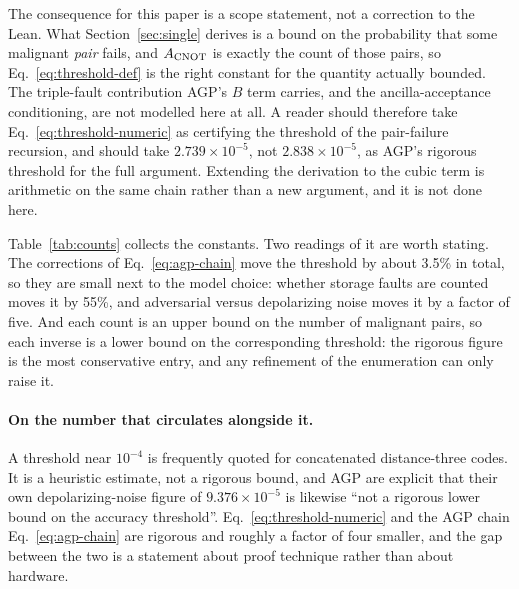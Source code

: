 \documentclass[aps,prx,reprint,nofootinbib,superscriptaddress]{revtex4-2}
\begin{document}
The consequence for this paper is a scope statement, not a correction to the
Lean. What Section~\ref{sec:single} derives is a bound on the probability that
some malignant \emph{pair} fails, and $A_{\rm CNOT}$ is exactly the count of
those pairs, so Eq.~\eqref{eq:threshold-def} is the right constant for the
quantity actually bounded. The triple-fault contribution AGP's $B$ term carries,
and the ancilla-acceptance conditioning, are not modelled here at all. A reader
should therefore take Eq.~\eqref{eq:threshold-numeric} as certifying the
threshold of the pair-failure recursion, and should take $2.739 \times 10^{-5}$,
not $2.838 \times 10^{-5}$, as AGP's rigorous threshold for the full argument.
Extending the derivation to the cubic term is arithmetic on the same chain
rather than a new argument, and it is not done here.

\begin{table}[htbp]
\caption{Malignant-pair counts AGP report for the Steane CNOT extended
rectangle, and the inverse of each. The last two rows are the corrected
constants of Eq.~\eqref{eq:agp-chain}, and $1/A''$ is AGP's published rigorous
threshold. The inverses in the first two rows are uncorrected, so they are not
AGP's thresholds for those models; for depolarizing noise AGP quote
$9.4 \times 10^{-5}$ and say explicitly that it is not a rigorous bound. The
spread across rows is the model-dependence of the constant, not an uncertainty
in it.}
\label{tab:counts}
\begin{ruledtabular}

\end{ruledtabular}
\end{table}

Table~\ref{tab:counts} collects the constants. Two readings of it are worth
stating. The corrections of Eq.~\eqref{eq:agp-chain} move the threshold by
about 3.5\% in total, so they are small next to the model choice: whether
storage faults are counted moves it by 55\%, and adversarial versus depolarizing
noise moves it by a factor of five. And each count is an upper bound on the
number of malignant pairs, so each inverse is a lower bound on the
corresponding threshold: the rigorous figure is the most conservative entry, and
any refinement of the enumeration can only raise it.

\paragraph{On the number that circulates alongside it.} A threshold near
$10^{-4}$ is frequently quoted for concatenated distance-three codes. It is a
heuristic estimate, not a rigorous bound, and AGP are explicit that their own
depolarizing-noise figure of $9.376 \times 10^{-5}$ is likewise ``not a rigorous
lower bound on the accuracy threshold''. Eq.~\eqref{eq:threshold-numeric} and the
AGP chain Eq.~\eqref{eq:agp-chain} are rigorous and roughly a factor of four
smaller, and the gap between the two is a statement about proof technique rather
than about hardware.
\end{document}
